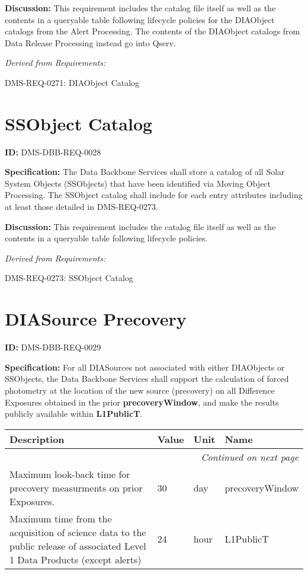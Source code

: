 \documentclass[SE,toc,lsstdraft]{lsstdoc}
\makeatletter
\newcommand{\paramname}[1]{\hspace{0pt}#1}
\newcommand{\unitname}[1]{\hspace{0pt}#1}
\newenvironment{parameters}[0]{%
\setlength\LTleft{0pt}
\setlength\LTright{\fill}
\begin{small}
\begin{longtable}[]{|p{0.49\textwidth}|l|p{0.6in}|p{1.70in}@{}|}

\hline \textbf{Description} & \textbf{Value} & \textbf{Unit} & \textbf{Name} \\ \hline
\endhead

\hline \multicolumn{4}{r}{\emph{Continued on next page}} \\
\endfoot

\hline\hline
\endlastfoot
}{%
\hline
\end{longtable}
\end{small}
}
\makeatother
\begin{document}
\textbf{Discussion:}
This requirement includes the catalog file itself as well as the contents in a queryable table following lifecycle policies for the DIAObject catalogs from the Alert Processing.  The contents of the DIAObject catalogs from Data Release Processing instead go into Qserv.

\emph{Derived from Requirements:}

DMS-REQ-0271:
DIAObject Catalog \newline

\section{SSObject Catalog}

\label{DMS-DBB-REQ-0028}
\textbf{ID:} DMS-DBB-REQ-0028

\textbf{Specification:}
The Data Backbone Services shall store a catalog of all Solar System Objects (SSObjects) that have been identified via Moving Object Processing. The SSObject catalog shall include for each entry attributes including at least those detailed in DMS-REQ-0273.

\textbf{Discussion:}
This requirement includes the catalog file itself as well as the contents in a queryable table following lifecycle policies.

\emph{Derived from Requirements:}

DMS-REQ-0273:
SSObject Catalog \newline

\section{DIASource Precovery}

\label{DMS-DBB-REQ-0029}
\textbf{ID:} DMS-DBB-REQ-0029

\textbf{Specification:}
For all DIASources not associated with either DIAObjects or SSObjects, the Data Backbone Services shall support the calculation of forced photometry at the location of the new source (precovery) on all Difference Exposures obtained in the prior \textbf{precoveryWindow}, and make the results publicly available within \textbf{L1PublicT}.

\begin{parameters}
Maximum look-back time for precovery measurments on prior Exposures.
&
30
&
\unitname{%
day
}
&
\paramname{%
precoveryWindow
} \\\hline
Maximum time from the acquisition of science data to the public release of associated Level 1 Data Products (except alerts)
&
24
&
\unitname{%
hour
}
&
\paramname{%
L1PublicT
} \\\hline
\end{parameters}
\end{document}
